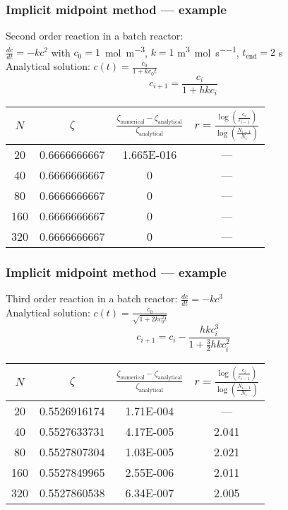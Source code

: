 \documentclass[11pt,table,final,fleqn,xcolor={usenames,dvipsnames,table}]{beamer}
\begin{document}
\begin{frame}
  \frametitle{Implicit midpoint method --- example}
  {\color{tuealert}Second order} reaction in a batch reactor:\\
  $\frac{dc}{dt} = -kc^2$ with $c_0 = 1$~\si{\mole\per\cubic\meter}, $k = 1$ \si{\cubic\meter\per\mole\per\second}, $t_\text{end} = 2$ \si{\second}\\
  Analytical solution: $c(t) = \frac{c_0}{1+kc_0t}$
  \[
    c_{i+1} = \frac{c_i}{1+hkc_i}
  \]
  \pause  
  \begin{longtable}{cccc}
    \hline
    $N$ & $\zeta$ & $\frac{\zeta^{}_\text{numerical}-\zeta_\text{analytical}}{\zeta_\text{analytical}}$ & $ r = \frac{\log\left(\frac{\epsilon_i}{\epsilon_{i-1}}\right)}{\log \left( \frac{N_{i-1}}{N_i}\right)} $ \\ \hline
    20  & 0.6666666667 & \num{1.665E-016} & ---\\
    40  & 0.6666666667 & \num{0} & ---\\
    80  & 0.6666666667 & \num{0} & ---\\
    160 & 0.6666666667 & \num{0} & ---\\
    320 & 0.6666666667 & \num{0} & ---\\
    \hline
  \end{longtable}
\end{frame}

\begin{frame}
  \frametitle{Implicit midpoint method --- example}
  {\color{tuealert}Third order} reaction in a batch reactor: $\frac{dc}{dt} = -kc^3$\\
  Analytical solution: $c(t) = \frac{c_0}{\sqrt{1+2kc_0^2t}}$
  \[
    c_{i+1} = c_i - \frac{hkc_i^3}{1+\frac{3}{2}hkc_i^2}
  \]
  \pause  
  \begin{longtable}{cccc}
    \hline
    $N$ & $\zeta$ & $\frac{\zeta^{}_\text{numerical}-\zeta_\text{analytical}}{\zeta_\text{analytical}}$ & $ r = \frac{\log\left(\frac{\epsilon_i}{\epsilon_{i-1}}\right)}{\log \left( \frac{N_{i-1}}{N_i}\right)} $ \\ \hline
    20  & 0.5526916174 & \num{1.71E-004} & ---\\
    40  & 0.5527633731 & \num{4.17E-005} & 2.041\\
    80  & 0.5527807304 & \num{1.03E-005} & 2.021\\
    160 & 0.5527849965 & \num{2.55E-006} & 2.011\\
    320 & 0.5527860538 & \num{6.34E-007} & 2.005\\
    \hline
  \end{longtable}
\end{frame}
\end{document}
